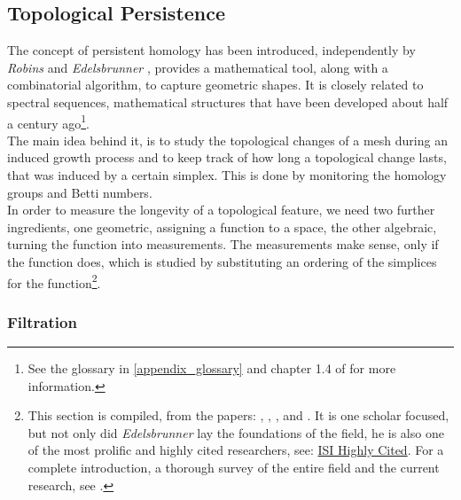 \subsection{Topological Persistence}
\label{math_topological_persistance}

The concept of persistent homology has been introduced, independently by \textit{Robins} \citep[][]{Robins1999} and \textit{Edelsbrunner} \citep[cf.][]{Edelsbrunner2000}, provides a mathematical tool, along with a combinatorial algorithm, to capture geometric shapes.
It is closely related to spectral sequences, mathematical structures that have been developed about half a century ago\footnote{ See the glossary in \ref{appendix_glossary} and chapter 1.4 of \citep[][]{Zomorodian2005} for more information.}.\\
The main idea behind it, is to study the topological changes of a mesh during an induced growth process and to keep track of how long a topological change lasts, that was induced by a  certain simplex.
This is done by monitoring the homology groups and Betti numbers.\\
In order to measure the longevity of a topological feature, we need two further ingredients, one geometric, assigning a function to a space, the other algebraic, turning the function into measurements.
The measurements make sense, only if the function does, which is studied by substituting an ordering of the simplices for the function\footnote{ This section is compiled, from the papers: \citep[cf.][]{Delfinado1995}, \citep[cf.][]{Edelsbrunner2000}, \citep[cf.][]{Edelsbrunner2001}, \citep[cf.][]{Zomorodian2008} and \citep[cf.][]{Edelsbrunner2006}. It is one scholar focused, but not only did \textit{Edelsbrunner} lay the foundations of the field, he is also one of the most prolific and highly cited researchers, see: \href{http://researchanalytics.thomsonreuters.com/highlycited/categories/computer_science/}{ISI Highly Cited}. For a complete introduction, a thorough survey of the entire field and the current research, see \citep[][]{Kozlov2008}.}.

\subsubsection{Filtration}
\label{math_filtration}

